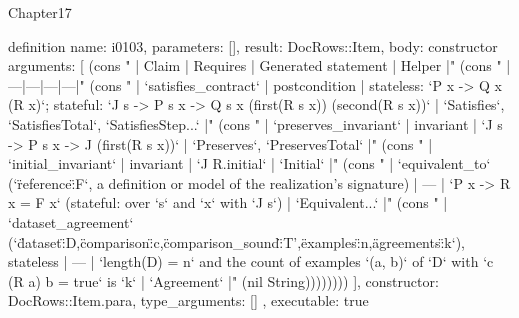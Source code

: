 \begin{lexlean}{Chapter17}
\begin{semanticmodule}
definition{
  name: i0103,
  parameters: [],
  result: DocRows::Item,
  body: constructor{
    arguments: [
      (cons "   | Claim | Requires | Generated statement | Helper |" (cons "   |---|---|---|---|" (cons "   | `satisfies_contract` | postcondition | stateless: `P x -> Q x (R x)`; stateful: `J s -> P s x -> Q s x (first(R s x)) (second(R s x))` | `Satisfies`, `SatisfiesTotal`, `SatisfiesStep...` |" (cons "   | `preserves_invariant` | invariant | `J s -> P s x -> J (first(R s x))` | `Preserves`, `PreservesTotal` |" (cons "   | `initial_invariant` | invariant | `J R.initial` | `Initial` |" (cons "   | `equivalent_to` (`\"reference\":F`, a definition or model of the realization's signature) | — | `P x -> R x = F x` (stateful: over `s` and `x` with `J s`) | `Equivalent...` |" (cons "   | `dataset_agreement` (`\"dataset\":D,\"comparison\":c,\"comparison_sound\":T',\"examples\":n,\"agreements\":k`), stateless | — | `length(D) = n` and the count of examples `(a, b)` of `D` with `c (R a) b = true` is `k` | `Agreement` |" (nil String))))))))
    ],
    constructor: DocRows::Item.para,
    type_arguments: []
  },
  executable: true
}


\end{semanticmodule}
\end{lexlean}
